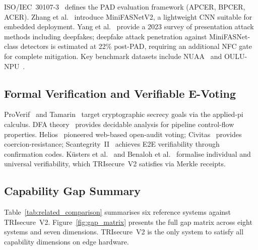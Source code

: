 \documentclass[submission]{sacjsub}
\begin{document}
ISO/IEC~30107-3~\cite{iso30107} defines the PAD evaluation framework
(APCER, BPCER, ACER). Zhang et al.~\cite{zhang2020minifasnet} introduce
MiniFASNetV2, a lightweight CNN suitable for embedded deployment. Yang
et al.~\cite{yang2023pad_survey} provide a 2023 survey of presentation
attack methods including deepfakes; deepfake attack penetration against
MiniFASNet-class detectors is estimated at 22\% post-PAD, requiring an
additional NFC gate for complete mitigation. Key benchmark datasets
include NUAA~\cite{tan2010nuaa} and OULU-NPU~\cite{boulkenafet2017oulu}.

\subsection{Formal Verification and Verifiable E-Voting}

ProVerif~\cite{blanchet2016proverif} and
Tamarin~\cite{meier2013tamarin} target cryptographic secrecy goals via
the applied-pi calculus. DFA theory~\cite{sipser2012introduction}
provides decidable analysis for pipeline control-flow properties.
Helios~\cite{adida2008helios} pioneered web-based open-audit voting;
Civitas~\cite{clarkson2008civitas} provides coercion-resistance;
Scantegrity~II~\cite{chaum2009scantegrity} achieves E2E verifiability
through confirmation codes. K\"{u}sters et
al.~\cite{kusters2010accountability} and Benaloh et
al.~\cite{benaloh2011e2e} formalise individual and universal
verifiability, which TRIsecure~V2 satisfies via Merkle receipts.

\subsection{Capability Gap Summary}

Table~\ref{tab:related_comparison} summarises six reference systems
against TRIsecure~V2. Figure~\ref{fig:gap_matrix} presents the full
gap matrix across eight systems and seven dimensions. TRIsecure~V2 is
the only system to satisfy all capability dimensions on edge hardware.
\end{document}
